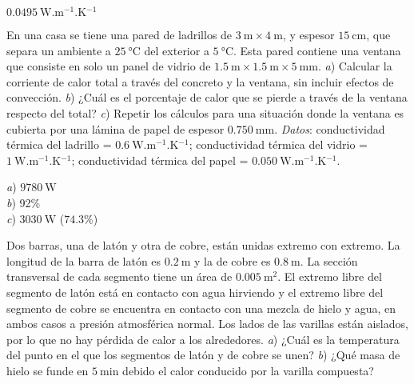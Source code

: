 \begin{Answer}
  $\SI{0.0495}{\watt.\metre^{-1}.\kelvin^{-1}}$
\end{Answer}
%
\begin{Exercise}\label{p:transmision00}
  {}{}
  En una casa se tiene una pared de ladrillos de $\SI{3}{\metre} \times \SI{4}{\metre}$, y espesor $\SI{15}{\centi\metre}$, que separa un ambiente a $\SI{25}{\celsius}$ del exterior a $\SI{5}{\celsius}$. Esta pared contiene una ventana que consiste en solo un panel de vidrio de $\SI{1.5}{\metre} \times \SI{1.5}{\metre} \times \SI{5}{\milli\metre}$. \textit{a}) Calcular la corriente de calor total a través del concreto y la ventana, sin incluir efectos de convección. \textit{b}) ¿Cuál es el porcentaje de calor que se pierde a través de la ventana respecto del total? \textit{c}) Repetir los cálculos para una situación donde la ventana es cubierta por una lámina de papel de espesor $\SI{0.750}{\milli\metre}$. \textit{Datos}: conductividad térmica del ladrillo = $\SI{0.6}{\watt.\metre^{-1}.\kelvin^{-1}}$; conductividad térmica del vidrio = $\SI{1}{\watt.\metre^{-1}.\kelvin^{-1}}$; conductividad térmica del papel = $\SI{0.050}{\watt.\metre^{-1}.\kelvin^{-1}}$.
\end{Exercise}
\begin{Answer}
	\begin{minipage}[t]{.4\textwidth}
    \textit{a}) $\SI{9780}{\watt}$\\ \textit{b}) 92\%\\ \textit{c}) $\SI{3030}{\watt}$ ($74.3$\%)
  \end{minipage}
\end{Answer}
%
\begin{Exercise}
  {}{}
  Dos barras, una de latón y otra de cobre, están unidas extremo con extremo. La longitud de la barra de latón es $\SI{0.2}{\metre}$ y la de cobre es $\SI{0.8}{\metre}$. La sección transversal de cada segmento tiene un área de $\SI{0.005}{\square\metre}$. El extremo libre del segmento de latón está en contacto con agua hirviendo y el extremo libre del segmento de cobre se encuentra en contacto con una mezcla de hielo y agua, en ambos casos a presión atmosférica normal. Los lados de las varillas están aislados, por lo que no hay pérdida de calor a los alrededores. \textit{a}) ¿Cuál es la temperatura del punto en el que los segmentos de latón y de cobre se unen? \textit{b}) ¿Qué masa de hielo se funde en $\SI{5}{\minute}$ debido el calor conducido por la varilla compuesta?
\end{Exercise}
